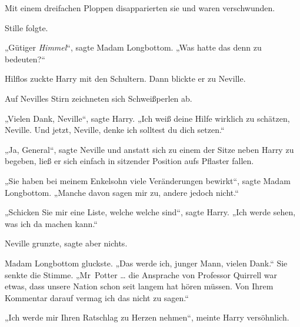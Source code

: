 Mit einem dreifachen Ploppen disapparierten sie und waren verschwunden.

Stille folgte.

„Gütiger \emph{Himmel}“, sagte Madam Longbottom.
„Was hatte das denn zu bedeuten?“

Hilflos zuckte Harry mit den Schultern. Dann blickte er zu Neville.

Auf Nevilles Stirn zeichneten sich Schweißperlen ab.

„Vielen Dank, Neville“, sagte Harry.
„Ich weiß deine Hilfe wirklich zu schätzen, Neville. Und jetzt, Neville, denke ich solltest du dich setzen.“

„Ja, General“, sagte Neville und anstatt sich zu einem der Sitze neben Harry zu begeben, ließ er sich einfach in sitzender Position aufs Pflaster fallen.

„Sie haben bei meinem Enkelsohn viele Veränderungen bewirkt“, sagte Madam Longbottom.
„Manche davon sagen mir zu, andere jedoch nicht.“

„Schicken Sie mir eine Liste, welche welche sind“, sagte Harry.
„Ich werde sehen, was ich da machen kann.“

Neville grunzte, sagte aber nichts.

Madam Longbottom gluckste.
„Das werde ich, junger Mann, vielen Dank.“ Sie senkte die Stimme.
„Mr~Potter … die Ansprache von Professor Quirrell war etwas, dass unsere Nation schon seit langem hat hören müssen. Von Ihrem Kommentar darauf vermag ich das nicht zu sagen.“

„Ich werde mir Ihren Ratschlag zu Herzen nehmen“, meinte Harry versöhnlich.

